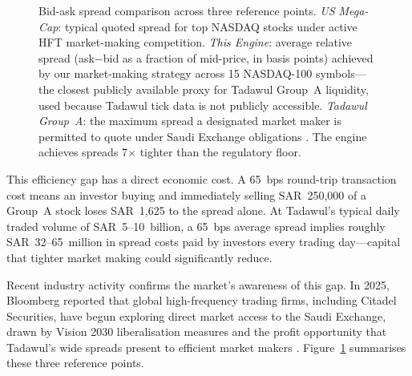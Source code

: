 \documentclass[12pt]{article}
\begin{document}
\begin{figure}[t]
\centering
{}
\caption{Bid-ask spread comparison across three reference points.
\textit{US Mega-Cap}: typical quoted spread for top NASDAQ stocks under
active HFT market-making competition.
\textit{This Engine}: average relative spread (ask$-$bid as a fraction
of mid-price, in basis points) achieved by our market-making strategy
across 15 NASDAQ-100 symbols---the closest publicly available proxy for
Tadawul Group~A liquidity, used because Tadawul tick data is not
publicly accessible.
\textit{Tadawul Group~A}: the maximum spread a designated market maker
is permitted to quote under Saudi Exchange obligations \cite{tadawul2023}.
The engine achieves spreads 7$\times$ tighter than the regulatory floor.}
\label{fig:efficiency_gap}
\end{figure}

This efficiency gap has a direct economic cost. A 65~bps round-trip
transaction cost means an investor buying and immediately selling SAR~250,000
of a Group~A stock loses SAR~1,625 to the spread alone. At Tadawul's typical
daily traded volume of SAR~5--10~billion, a 65~bps average spread implies
roughly SAR~32--65~million in spread costs paid by investors every trading
day---capital that tighter market making could significantly reduce.

Recent industry activity confirms the market's awareness of this gap. In 2025,
Bloomberg reported that global high-frequency trading firms, including Citadel
Securities, have begun exploring direct market access to the Saudi Exchange,
drawn by Vision 2030 liberalisation measures and the profit opportunity that
Tadawul's wide spreads present to efficient market makers \cite{bloomberg2025}.
Figure~\ref{fig:efficiency_gap} summarises these three reference points.
\end{document}
